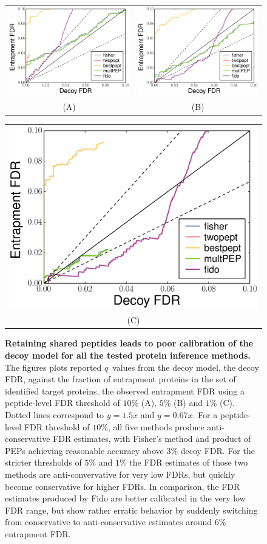 \documentclass{article}
\begin{document}
\begin{figure}
\begin{center}
\begin{tabular}{cc} 
\includegraphics[width=0.45\linewidth]
  {./img/shared-pept-accuracy-fdr10-with-fido-exact} &
\includegraphics[width=0.45\linewidth]
  {./img/shared-pept-accuracy-fdr5-with-fido-exact}\\
 (A) & (B) 
\end{tabular}
\begin{tabular}{c} 
\includegraphics[width=0.45\linewidth]
  {./img/shared-pept-accuracy-fdr1-with-fido-exact}\\
(C)
\end{tabular}
\caption{\label{fig:shared-accuracy}\textbf{Retaining shared peptides
leads to poor calibration of the decoy model for all the tested
protein inference methods.} The figures plots reported $q$~values from
the decoy model, the decoy FDR, against the fraction of entrapment
proteins in the set of identified target proteins, the observed
entrapment FDR using a peptide-level FDR threshold of $10\%$ (A),
$5\%$ (B) and $1\%$ (C). Dotted lines correspond to $y=1.5x$ and
$y=0.67x$.  For a peptide-level FDR threshold of $10\%$, all five
methods produce anti-conservative FDR estimates, with Fisher's method
and product of PEPs achieving reasonable accuracy above $3\%$ decoy
FDR. For the stricter thresholds of $5\%$ and $1\%$ the FDR estimates
of those two methods are anti-convervative for very low FDRs, but
quickly become conservative for higher FDRs. In comparison, the FDR 
estimates produced by Fido are better calibrated in the very 
low FDR range, but show rather erratic behavior by suddenly switching 
from conservative to anti-conservative estimates around $6\%$ 
entrapment FDR.}
\end{center}
\end{figure}
\end{document}
